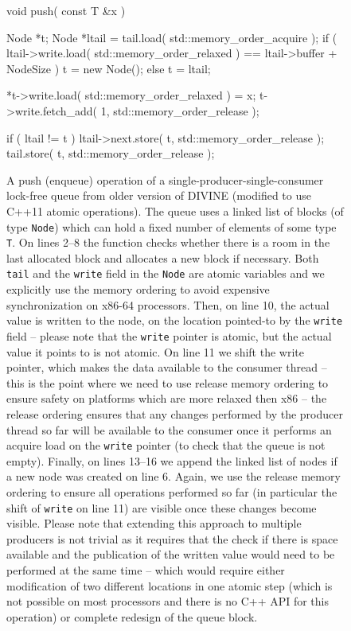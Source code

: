 \begin{figure}[tp]
  \begin{cppcode}
    void push( const T &x ) {
        Node *t;
        Node *ltail = tail.load( std::memory_order_acquire );
        if ( ltail->write.load( std::memory_order_relaxed )
                == ltail->buffer + NodeSize )
            t = new Node();
        else
            t = ltail;

        *t->write.load( std::memory_order_relaxed ) = x;
        t->write.fetch_add( 1, std::memory_order_release );

        if ( ltail != t ) {
            ltail->next.store( t, std::memory_order_release );
            tail.store( t, std::memory_order_release );
        }
    }
  \end{cppcode}
  \caption{A push (enqueue) operation of a single-producer-single-consumer
    lock-free queue from older version of DIVINE (modified to use C++11 atomic
    operations).
    The queue uses a linked list of blocks (of type \texttt{Node}) which can
    hold a fixed number of elements of some type \texttt{T}.
    On lines 2--8 the function checks whether there is a room in the last
    allocated block and allocates a new block if necessary.
    Both \texttt{tail} and the \texttt{write} field in the \texttt{Node} are
    atomic variables and we explicitly use the memory ordering to avoid
    expensive synchronization on x86-64 processors.
    Then, on line 10, the actual value is written to the node, on the location
    pointed-to by the \texttt{write} field -- please note that the
    \texttt{write} pointer is atomic, but the actual value it points to is not
    atomic.
    On line 11 we shift the write pointer, which makes the data available to
    the consumer thread -- this is the point where we need to use release
    memory ordering to ensure safety on platforms which are more relaxed then
    x86 -- the release ordering ensures that any changes performed by the
    producer thread so far will be available to the consumer once it performs
    an acquire load on the \texttt{write} pointer (to check that the queue is
    not empty).
    Finally, on lines 13--16 we append the linked list of nodes if a new node
    was created on line 6.
    Again, we use the release memory ordering to ensure all operations
    performed so far (in particular the shift of \texttt{write} on line 11) are
    visible once these changes become visible.
    Please note that extending this approach to multiple producers is not
    trivial as it requires that the check if there is space available and the
    publication of the written value would need to be performed at the same
    time -- which would require either modification of two different locations
    in one atomic step (which is not possible on most processors and there is
    no C++ API for this operation) or complete redesign of the queue block.
  }\label{fig:prelim:lockfree}
\end{figure}

